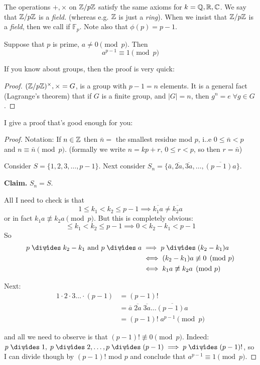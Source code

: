 \documentclass[10pt]{scrartcl}
\begin{document}
The operations $+, \times$ on $\mathbb{Z} / p\mathbb{Z}$ satisfy the same axioms for $k = \mathbb{Q}, \mathbb{R}, \mathbb{C}$. We say that $\mathbb{Z} / p\mathbb{Z}$ is a \emph{field.} (whereas e.g. $\mathbb{Z}$ is just a \emph{ring}). When we insist that $\mathbb{Z} / p\mathbb{Z}$ is a \emph{field}, then we call if $\mathbb{F}_p$. Note also that $\phi(p) = p-1$. \\


\begin{theorem}
Suppose that $p$ is prime, $a \neq 0 \pmod{p}$. Then 
\[a^{p-1} \equiv 1 \pmod{p}\]
\end{theorem}\vspace*{5pt}

If you know about groups, then the proof is very quick: 
\begin{proof}
$(\mathbb{Z} / p\mathbb{Z})^\times, \times = G$, is a group with $p-1 = n$ elements. It is a general fact (Lagrange's theorem) that if $G$ is a finite group, and $|G| = n$, then $g^n = e\; \forall g \in G$. 
\end{proof}

I give a proof that's good enough for you:
\begin{proof}

Notation: If $n \in\mathbb{Z}$ then $\bar{n}= $ the smallest residue mod $p$, i..e $0 \leq \bar{n} < p$ and $n \equiv \bar{n} \pmod{p}$. (formally we write $n = kp + r,\, 0 \leq r < p$, so then $r = \bar{n}$)

Consider $S = \{1,2,3,\dots,p-1\}$. Next consider $S_n = \{\bar{a},\overline{2a},\overline{3a},\dots,\overline{(p-1)a}\}$. 

\textbf{Claim.} $S_n =S$. 

All I need to check is that 
\[1 \leq k_1 < k_2 \leq p-1 \implies \overline{k_1a} \neq \overline{k_2a}\]
or in fact $k_1a \not\equiv k_2a \pmod{p}$. But this is completely obvious: 
\[ \leq k_1 < k_2 \leq p-1 \implies 0 < k_2 - k_1 < p-1\]
So \[\begin{aligned}p \centernot\divides k_2 - k_1 \text{ and }p \centernot\divides a &\implies p \centernot\divides (k_2-k_1)a\\ &\iff (k_2-k_1)a \not\equiv 0\pmod{p}\\ &\iff k_1a \not \equiv k_2 a\pmod{p}\end{aligned}\] 

Next: 
\[
\begin{aligned}
  1\cdot 2 \cdot 3 \dots \cdot (p-1) &= (p-1)!\\
  &= \overline{a}\;\overline{2a}\;\overline{3a} \dots \overline{(p-1)a}\\
  &= (p-1)!\; a^{p-1}\pmod{p}
\end{aligned}
\]

and all we need to observe is that $(p-1)! \not\equiv 0 \pmod{p}$.
Indeed: $p \centernot\divides 1,\; p \centernot\divides 2, \dots, p\centernot\divides (p-1) \implies p \centernot\divides (p-1)!$,  so I can divide though by $(p-1)!$ mod $p$ and conclude that 
$a^{p-1} \equiv 1 \pmod{p}$.
\end{proof}\vspace*{5pt}
\end{document}
